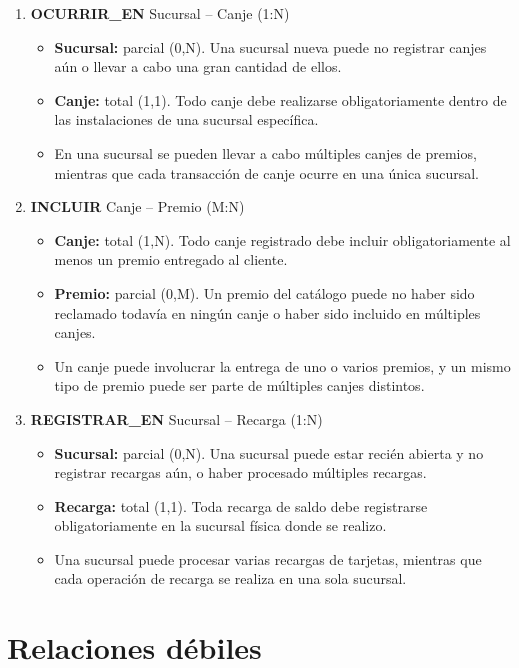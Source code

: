 \documentclass[12pt]{article}
\begin{document}
\begin{enumerate}
    \item \textbf{OCURRIR\_EN} Sucursal -- Canje (1:N)
    \begin{itemize}
        \item \textbf{Sucursal:} parcial (0,N). Una sucursal nueva puede no registrar canjes aún o llevar a cabo una gran cantidad de ellos.
        \item \textbf{Canje:} total (1,1). Todo canje debe realizarse obligatoriamente dentro de las instalaciones de una sucursal específica.
        \item En una sucursal se pueden llevar a cabo múltiples canjes de premios, mientras que cada transacción de canje ocurre en una única sucursal.
    \end{itemize}

    \item \textbf{INCLUIR} Canje -- Premio (M:N)
    \begin{itemize}
        \item \textbf{Canje:} total (1,N). Todo canje registrado debe incluir obligatoriamente al menos un premio entregado al cliente.
        \item \textbf{Premio:} parcial (0,M). Un premio del catálogo puede no haber sido reclamado todavía en ningún canje o haber sido incluido en múltiples canjes.
        \item Un canje puede involucrar la entrega de uno o varios premios, y un mismo tipo de premio puede ser parte de múltiples canjes distintos.
    \end{itemize}

    \item \textbf{REGISTRAR\_EN} Sucursal -- Recarga (1:N)
    \begin{itemize}
        \item \textbf{Sucursal:} parcial (0,N). Una sucursal puede estar recién abierta y no registrar recargas aún, o haber procesado múltiples recargas.
        \item \textbf{Recarga:} total (1,1). Toda recarga de saldo debe registrarse obligatoriamente en la sucursal física donde se realizo.
        \item Una sucursal puede procesar varias recargas de tarjetas, mientras que cada operación de recarga se realiza en una sola sucursal.
    \end{itemize}
    
\end{enumerate}

\newpage
\section*{Relaciones débiles}
\end{document}
